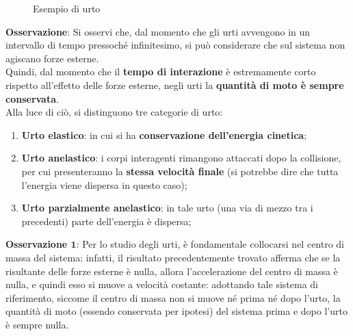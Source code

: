 \documentclass[a4paper]{extarticle}
\begin{document}
\begin{figure}[H]
  \caption{Esempio di urto}
  \label{fig:esempio_di_urto}
\end{figure}

\vspace{1em}
\noindent
\textbf{Osservazione}: Si osservi che, dal momento che gli urti avvengono in un intervallo di tempo pressoché infinitesimo, si può considerare che sul sistema non agiscano forze esterne.\\
Quindi, dal momento che il \textbf{tempo di interazione} è estremamente corto rispetto all'effetto delle forze esterne, negli urti la \textbf{quantità di moto è sempre conservata}.\\
Alla luce di ciò, si distinguono tre categorie di urto:
\begin{enumerate}
  \item \textbf{Urto elastico}: in cui si ha \textbf{conservazione dell'energia cinetica};
  \item \textbf{Urto anelastico}: i corpi interagenti rimangono attaccati dopo la collisione, per cui presenteranno la \textbf{stessa velocità finale} (si potrebbe dire che tutta l'energia viene dispersa in questo caso);
  \item \textbf{Urto parzialmente anelastico}: in tale urto (una via di mezzo tra i precedenti) parte dell'energia è dispersa;
\end{enumerate}

\vspace{1em}
\noindent
\textbf{Osservazione $\boldsymbol{1}$}: Per lo studio degli urti, è fondamentale collocarsi nel centro di massa del sistema: infatti, il risultato precedentemente trovato afferma che se la risultante delle forze esterne è nulla, allora l'accelerazione del centro di massa è nulla, e quindi esso si muove a velocità costante: adottando tale sistema di riferimento, siccome il centro di massa non si muove né prima né dopo l'urto, la quantità di moto (essendo conservata per ipotesi) del sistema prima e dopo l'urto è sempre nulla.
\end{document}
